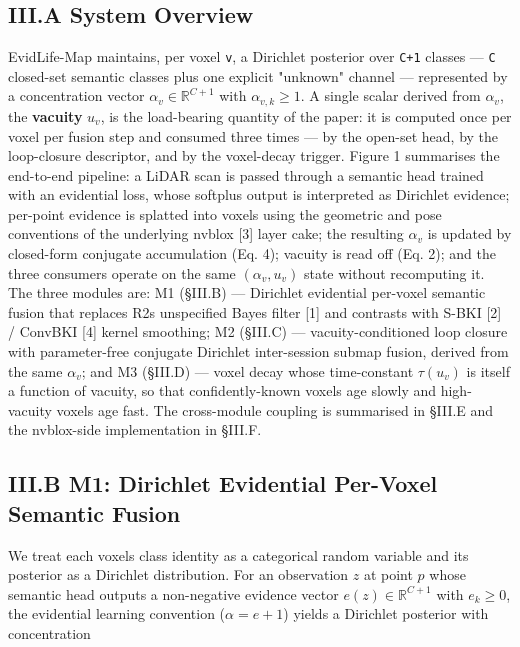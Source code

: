 \documentclass[
]{article}
\begin{document}
\subsection{III.A System Overview}\label{iiia-system-overview}

EvidLife-Map maintains, per voxel \texttt{v}, a Dirichlet posterior over
\texttt{C+1} classes --- \texttt{C} closed-set semantic classes plus one
explicit "unknown" channel --- represented by a concentration vector
\(\alpha_v \in \mathbb{R}^{C+1}\) with \(\alpha_{v,k} \ge 1\). A single
scalar derived from \(\alpha_v\), the \textbf{vacuity} \(u_v\), is the
load-bearing quantity of the paper: it is computed once per voxel per
fusion step and consumed three times --- by the open-set head, by the
loop-closure descriptor, and by the voxel-decay trigger. Figure 1
summarises the end-to-end pipeline: a LiDAR scan is passed through a
semantic head trained with an evidential loss, whose softplus output is
interpreted as Dirichlet evidence; per-point evidence is splatted into
voxels using the geometric and pose conventions of the underlying nvblox
{[}3{]} layer cake; the resulting \(\alpha_v\) is updated by closed-form
conjugate accumulation (Eq. 4); vacuity is read off (Eq. 2); and the
three consumers operate on the same \((\alpha_v, u_v)\) state without
recomputing it. The three modules are: M1 (§III.B) --- Dirichlet
evidential per-voxel semantic fusion that replaces R2\textquotesingle s
unspecified Bayes filter {[}1{]} and contrasts with S-BKI {[}2{]} /
ConvBKI {[}4{]} kernel smoothing; M2 (§III.C) --- vacuity-conditioned
loop closure with parameter-free conjugate Dirichlet inter-session
submap fusion, derived from the same \(\alpha_v\); and M3 (§III.D) ---
voxel decay whose time-constant \(\tau(u_v)\) is itself a function of
vacuity, so that confidently-known voxels age slowly and high-vacuity
voxels age fast. The cross-module coupling is summarised in §III.E and
the nvblox-side implementation in §III.F.

\subsection{III.B M1: Dirichlet Evidential Per-Voxel Semantic
Fusion}\label{iiib-m1-dirichlet-evidential-per-voxel-semantic-fusion}

We treat each voxel\textquotesingle s class identity as a categorical
random variable and its posterior as a Dirichlet distribution. For an
observation \(z\) at point \(p\) whose semantic head outputs a
non-negative evidence vector \(e(z) \in \mathbb{R}^{C+1}\) with
\(e_k \ge 0\), the evidential learning convention (\(\alpha = e + 1\))
yields a Dirichlet posterior with concentration
\end{document}
